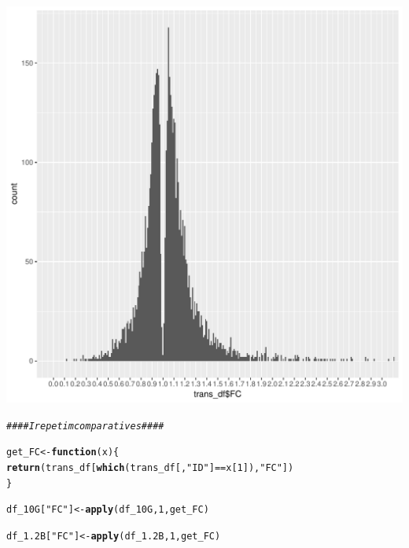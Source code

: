\documentclass[12pt, a4paper]{article}\usepackage[]{graphicx}\usepackage[]{color}
\makeatletter
\def\maxwidth{ %
  \ifdim\Gin@nat@width>\linewidth
    \linewidth
  \else
    \Gin@nat@width
  \fi
}
\newcommand{\hlnum}[1]{\textcolor[rgb]{0.686,0.059,0.569}{#1}}%
\newcommand{\hlstr}[1]{\textcolor[rgb]{0.192,0.494,0.8}{#1}}%
\newcommand{\hlcom}[1]{\textcolor[rgb]{0.678,0.584,0.686}{\textit{#1}}}%
\newcommand{\hlopt}[1]{\textcolor[rgb]{0,0,0}{#1}}%
\newcommand{\hlstd}[1]{\textcolor[rgb]{0.345,0.345,0.345}{#1}}%
\newcommand{\hlkwa}[1]{\textcolor[rgb]{0.161,0.373,0.58}{\textbf{#1}}}%
\newcommand{\hlkwb}[1]{\textcolor[rgb]{0.69,0.353,0.396}{#1}}%
\newcommand{\hlkwc}[1]{\textcolor[rgb]{0.333,0.667,0.333}{#1}}%
\newcommand{\hlkwd}[1]{\textcolor[rgb]{0.737,0.353,0.396}{\textbf{#1}}}%
\newenvironment{kframe}{%
 \def\at@end@of@kframe{}%
 \ifinner\ifhmode%
  \def\at@end@of@kframe{\end{minipage}}%
  \begin{minipage}{\columnwidth}%
 \fi\fi%
 \def\FrameCommand##1{\hskip\@totalleftmargin \hskip-\fboxsep
 \colorbox{shadecolor}{##1}\hskip-\fboxsep
     \hskip-\linewidth \hskip-\@totalleftmargin \hskip\columnwidth}%
 \MakeFramed {\advance\hsize-\width
   \@totalleftmargin\z@ \linewidth\hsize
   \@setminipage}}%
 {\par\unskip\endMakeFramed%
 \at@end@of@kframe}
\newenvironment{knitrout}{}{} %
\makeatother
\begin{document}
\begin{knitrout}
\begin{kframe}
{\ttfamily\noindent\color{warningcolor}{\#\# Warning: Removed 129 rows containing non-finite values (stat\_bin).}}\end{kframe}
\includegraphics[width=\maxwidth]{figure/unnamed-chunk-10-2} 
\begin{kframe}\begin{alltt}
\hlcom{#### I repetim comparatives ####}


\hlstd{get_FC} \hlkwb{<-} \hlkwa{function}\hlstd{(}\hlkwc{x}\hlstd{)\{}
  \hlkwd{return}\hlstd{(trans_df[}\hlkwd{which}\hlstd{(trans_df[,}\hlstr{"ID"}\hlstd{]} \hlopt{==} \hlstd{x[}\hlnum{1}\hlstd{]),}\hlstr{"FC"}\hlstd{])}
\hlstd{\}}

\hlstd{df_10G[}\hlstr{"FC"}\hlstd{]} \hlkwb{<-} \hlkwd{apply}\hlstd{(df_10G,} \hlnum{1}\hlstd{, get_FC)}
\end{alltt}


{\ttfamily\noindent\color{warningcolor}{\#\# Warning in `[<-.data.frame`(`*tmp*`, "{}FC"{}, value = list(9.99246559115003, : provided 80 variables to replace 1 variables}}\begin{alltt}
\hlstd{df_1.2B[}\hlstr{"FC"}\hlstd{]} \hlkwb{<-} \hlkwd{apply}\hlstd{(df_1.2B,} \hlnum{1}\hlstd{, get_FC)}
\end{alltt}



\end{kframe}
\end{knitrout}
\end{document}
